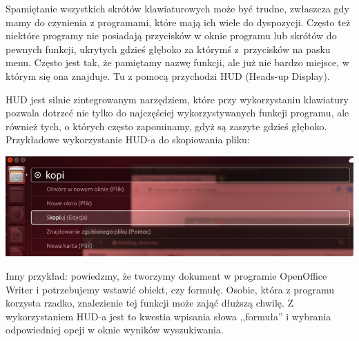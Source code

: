 Spamiętanie wszystkich skrótów klawiaturowych może być trudne, zwłaszcza gdy mamy do czynienia z programami, które mają ich wiele do dyspozycji. Często też niektóre programy nie posiadają przycisków w oknie programu lub skrótów do pewnych funkcji, ukrytych gdzieś głęboko za którymś z~przycisków na pasku menu. Często jest tak, że pamiętamy nazwę funkcji, ale już nie bardzo miejsce, w którym się ona znajduje. Tu z pomocą przychodzi \textcolor{ubuntu_orange}{HUD} (Heads-up Display).

HUD jest silnie zintegrowanym narzędziem, które przy wykorzystaniu klawiatury pozwala dotrzeć nie tylko do najczęściej wykorzystywanych funkcji programu, ale również tych, o których często zapominamy, gdyż są zaszyte gdzieś głęboko. Przykładowe wykorzystanie HUD-a do skopiowania pliku:

\begin{center}
	\includegraphics[width=\linewidth]{images/unity_hud1.png}
\end{center}

Inny przykład: powiedzmy, że tworzymy dokument w programie OpenOffice Writer i potrzebujemy wstawić obiekt, czy formułę. Osobie, która z programu korzysta rzadko, znalezienie tej funkcji może zająć dłuższą chwilę. Z wykorzystaniem HUD-a jest to kwestia wpisania słowa ,,formuła'' i wybrania odpowiedniej opcji w oknie wyników wyszukiwania.
